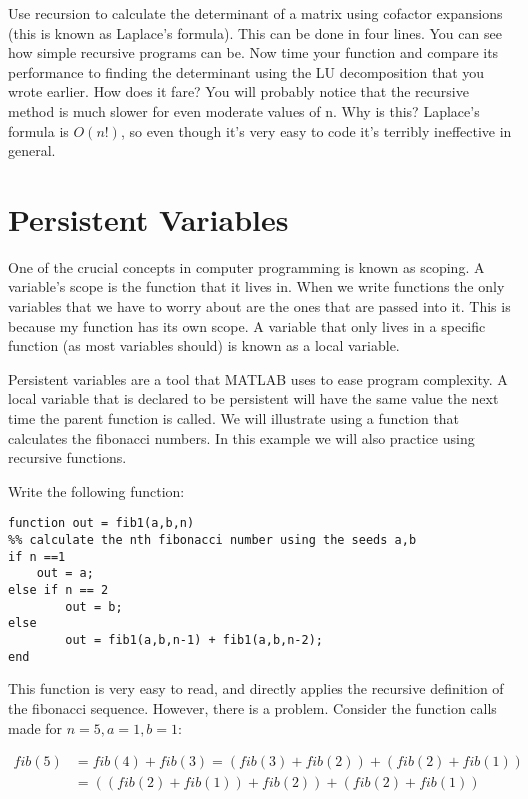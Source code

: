 \begin{problem}
Use recursion to calculate the determinant of a matrix using cofactor expansions (this is known as Laplace's formula). This can be done in four lines. You can see how simple recursive programs can be. Now time your function and compare its performance to finding the determinant using the LU decomposition that you wrote earlier. How does it fare? You will probably notice that the recursive method is much slower for even moderate values of n. Why is this? Laplace's formula is $O(n!)$, so even though it's very easy to code it's terribly ineffective in general.
\end{problem}

\section*{Persistent Variables}

One of the crucial concepts in computer programming is known as scoping. A variable's scope is the function that it lives in. When we write functions the only variables that we have to worry about are the ones that are passed into it. This is because my function has its own scope. A variable that only lives in a specific function (as most variables should) is known as a local variable.

Persistent variables are a tool that MATLAB uses to ease program complexity. A local variable that is declared to be persistent will have the same value the next time the parent function is called. We will illustrate using a function that calculates the fibonacci numbers. In this example we will also practice using recursive functions.

Write the following function:

\begin{lstlisting}[style=matlab]
function out = fib1(a,b,n)
%% calculate the nth fibonacci number using the seeds a,b
if n ==1
	out = a;
else if n == 2
        out = b;
else
        out = fib1(a,b,n-1) + fib1(a,b,n-2);
end
\end{lstlisting}

This function is very easy to read, and directly applies the recursive definition of the fibonacci sequence. However, there is a problem. Consider the function calls made for $n=5, a = 1, b = 1$:

\begin{align*}
fib(5) &= fib(4) + fib(3) = (fib(3) + fib(2)) + (fib(2) + fib(1)) \\
       &= ((fib(2) + fib(1)) + fib(2)) + (fib(2) + fib(1))
\end{align*}

